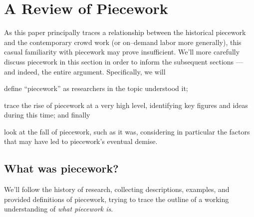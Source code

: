 \documentclass[trackingWork]{subfiles}
\begin{document}
\section{A Review of Piecework}
As this paper principally traces a relationship between
the historical piecework and the contemporary crowd work
(or on--demand labor more generally),
this casual familiarity with piecework may prove insufficient.
We'll more carefully discuss piecework in this section in order
to inform the subsequent sections --- and indeed, the entire argument.
Specifically, we will
\begin{inlinelist}
  \item define ``piecework'' as researchers in the topic understood it;
  \item trace the rise of piecework at a very high level,
        identifying key figures and ideas during this time; and finally
  \item look at the fall of piecework, such as it was,
        considering in particular
        the factors that may have led to piecework's
        eventual demise.
\end{inlinelist}



\subsection{What was piecework?}
We'll follow the history of research, collecting
descriptions,
examples, and
provided definitions of piecework, trying
to trace the outline of a working understanding of
\textit{what piecework is}.
\end{document}
